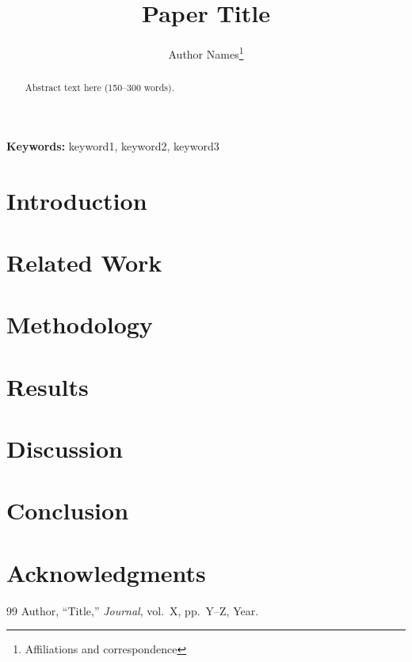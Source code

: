 \documentclass[11pt,a4paper]{article}
\title{Paper Title}
\author{Author Names\thanks{Affiliations and correspondence}}
\date{}
\begin{document}
\maketitle

\begin{abstract}
Abstract text here (150--300 words).
\end{abstract}

\noindent\textbf{Keywords:} keyword1, keyword2, keyword3


\section{Introduction}

\section{Related Work}

\section{Methodology}

\section{Results}

\section{Discussion}

\section{Conclusion}


\section*{Acknowledgments}

\begin{thebibliography}{99}
 Author, ``Title,'' \textit{Journal}, vol.~X, pp.~Y--Z, Year.
\end{thebibliography}

\end{document}
